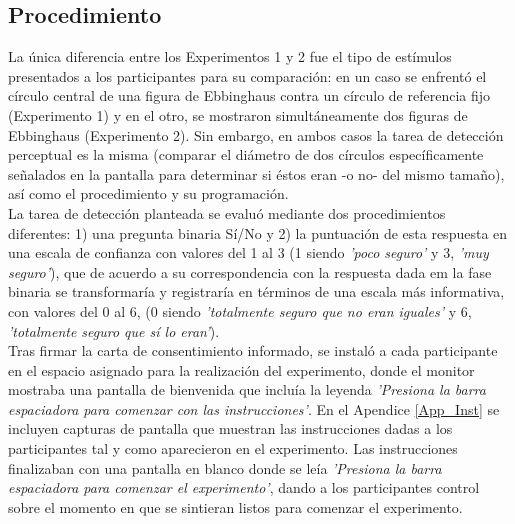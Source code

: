 \begin{itemize}
\section{Procedimiento}

La única diferencia entre los Experimentos 1 y 2 fue el tipo de estímulos presentados a los participantes para su comparación: en un caso se enfrentó el círculo central de una figura de Ebbinghaus contra un círculo de referencia fijo (Experimento 1) y en el otro, se mostraron simultáneamente dos figuras de Ebbinghaus (Experimento 2). Sin embargo, en ambos casos la tarea de detección perceptual es la misma (comparar el diámetro de dos círculos específicamente señalados en la pantalla para determinar si éstos eran -o no- del mismo tamaño), así como el procedimiento y su programación.\\

La tarea de detección planteada se evaluó mediante dos procedimientos diferentes: 1) una pregunta binaria Sí/No y 2) la puntuación de esta respuesta en una escala de confianza con valores del 1 al 3 (1 siendo \textit{'poco seguro'} y 3, \textit{'muy seguro'}), que de acuerdo a su correspondencia con la respuesta dada em la fase binaria se transformaría y registraría en términos de una escala más informativa, con valores del 0 al 6, (0 siendo \textit{'totalmente seguro que no eran iguales'} y 6, \textit{'totalmente seguro que sí lo eran'}).\\

Tras firmar la carta de consentimiento informado, se instaló a cada participante en el espacio asignado para la realización del experimento, donde el monitor mostraba una pantalla de bienvenida que incluía la leyenda \textit{'Presiona la barra espaciadora para comenzar con las instrucciones'}. En el Apendice \ref{App_Inst} se incluyen capturas de pantalla que muestran las instrucciones dadas a los participantes tal y como aparecieron en el experimento. Las instrucciones finalizaban con una pantalla en blanco donde se leía \textit{'Presiona la barra espaciadora para comenzar el experimento'}, dando a los participantes control sobre el momento en que se sintieran listos para comenzar el experimento.\\


\end{itemize}
